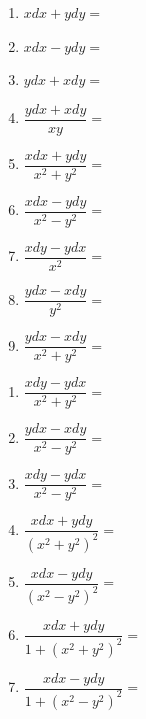 \documentclass[a4paper,12pt]{article}
\begin{document}
    \newpage

    \begin{center}
        \begin{minipage}[t]{0.46\textwidth}
            \begin{enumerate}[label=(\arabic*), leftmargin=2em, itemsep=1em]
                \item $xdx + ydy = $
                \item $xdx - ydy = $
                \item $ydx + xdy = $
                \item $\dfrac{ydx + xdy}{xy} = $
                \item $\dfrac{xdx + ydy}{x^{2}+y^{2}} = $
                \item $\dfrac{xdx - ydy}{x^{2}-y^{2}} = $
                \item $\dfrac{xdy - ydx}{x^{2}} = $
                \item $\dfrac{ydx - xdy}{y^{2}} = $
                \item $\dfrac{ydx - xdy}{x^{2}+y^{2}} = $
            \end{enumerate}
        \end{minipage}
        \hfill
        \begin{minipage}[t]{0.46\textwidth}
            \begin{enumerate}[label=(\arabic*), leftmargin=2em, itemsep=1em, start=10]
                \item $\dfrac{xdy - ydx}{x^{2}+y^{2}} = $
                \item $\dfrac{ydx - xdy}{x^{2}-y^{2}} = $
                \item $\dfrac{xdy - ydx}{x^{2}-y^{2}} = $
                \item $\dfrac{xdx + ydy}{(x^{2}+y^{2})^{2}} = $
                \item $\dfrac{xdx - ydy}{(x^{2}-y^{2})^{2}} = $
                \item $\dfrac{xdx + ydy}{1+(x^{2}+y^{2})^{2}} = $
                \item $\dfrac{xdx - ydy}{1+(x^{2}-y^{2})^{2}} = $
            \end{enumerate}
        \end{minipage}
        \hfill
    \end{center}
\end{document}
